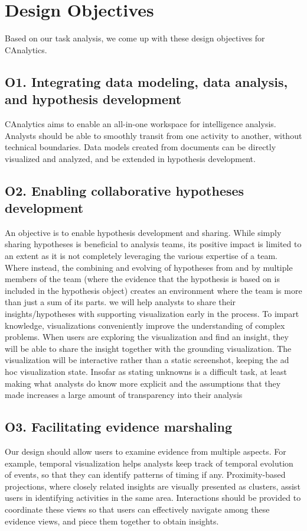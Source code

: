 \section{Design Objectives}

Based on our task analysis, we come up with these design objectives for CAnalytics.

\subsection{O1. Integrating data modeling, data analysis, and hypothesis development}
CAnalytics aims to enable an all-in-one workspace for intelligence analysis. Analysts should be able to smoothly transit from one activity to another, without technical boundaries. Data models created from documents can be directly visualized and analyzed, and be extended in hypothesis development.
\subsection{O2. Enabling collaborative hypotheses development}
An objective is to enable hypothesis development and sharing. While simply sharing hypotheses is beneficial to analysis teams, its positive impact is limited to an extent as it is not completely leveraging the various expertise of a team. Where instead, the combining and evolving of hypotheses from and by multiple members of the team (where the evidence that the hypothesis is based on is included in the hypothesis object) creates an environment where the team is more than just a sum of its parts.
we will help analysts to share their insights/hypotheses with supporting visualization early in the process. To impart knowledge, visualizations conveniently improve the understanding of complex problems. When users are exploring the visualization and find an insight, they will be able to share the insight together with the grounding visualization. The visualization will be interactive rather than a static screenshot, keeping the ad hoc visualization state. 
Insofar as stating unknowns is a difficult task, at least making what analysts do know more explicit and the assumptions that they made increases a large amount of transparency into their analysis
\subsection{O3. Facilitating evidence marshaling}
Our design should allow users to examine evidence from multiple aspects. For example, temporal visualization helps analysts keep track of temporal evolution of events, so that they can identify patterns of timing if any. Proximity-based projections, where closely related insights are visually presented as clusters, assist users in identifying activities in the same area. Interactions should be provided to coordinate these views so that users can effectively navigate among these evidence views, and piece them together to obtain insights.
